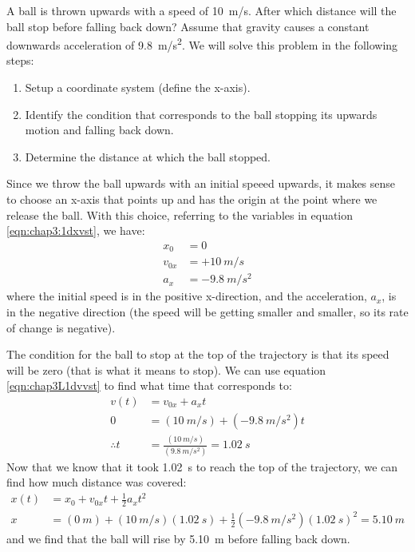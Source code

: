 \begin{example}{A ball is thrown upwards with a speed of \SI{10}{m/s}. After which distance will the ball stop before falling back down? Assume that gravity causes a constant downwards acceleration of \SI{9.8}{m/s^2}.}
\label{ex:chap3:ballupandown}
We will solve this problem in the following steps:
\begin{enumerate}[topsep=-10pt]
\item Setup a coordinate system (define the x-axis).
\item Identify the condition that corresponds to the ball stopping its upwards motion and falling back down.
\item Determine the distance at which the ball stopped.
\end{enumerate}
Since we throw the ball upwards with an initial speeed upwards, it makes sense to choose an x-axis that points up and has the origin at the point where we release the ball. With this choice, referring to the variables in equation \ref{eqn:chap3:1dxvst}, we have:
\begin{align*}
x_0&=0\\
v_{0x}&=+\SI{10}{m/s}\\
a_x&=\SI{-9.8}{m/s^2}
\end{align*}
where the initial speed is in the positive x-direction, and the acceleration, $a_x$, is in the negative direction (the speed will be getting smaller and smaller, so its rate of change is negative).

The condition for the ball to stop at the top of the trajectory is that its speed will be zero (that is what it means to stop). We can use equation \ref{eqn:chap3L1dvvst} to find what time that corresponds to:
\begin{align*}
v(t) &= v_{0x}+a_xt\\
0 &= (\SI{10}{m/s}) + (\SI{-9.8}{m/s^2})t\\
\therefore t&=\frac{(\SI{10}{m/s})}{(\SI{9.8}{m/s^2})}=\SI{1.02}{s}
\end{align*}
Now that we know that it took \SI{1.02}{s} to reach the top of the trajectory, we can find how much distance was covered:
\begin{align*}
x(t) &= x_0+v_{0x}t+ \frac{1}{2}a_xt^2\\
x &= (\SI{0}{m})+(\SI{10}{m/s})(\SI{1.02}{s})+\frac{1}{2}(\SI{-9.8}{m/s^2})(\SI{1.02}{s})^2 = \SI{5.10}{m}
\end{align*}
and we find that the ball will rise by \SI{5.10}{m} before falling back down. 
\end{example}

